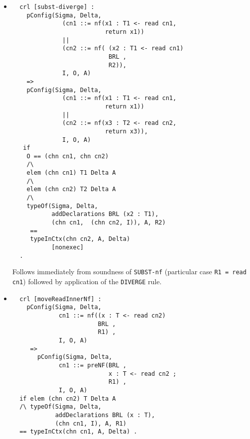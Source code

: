 \documentclass{article}
\begin{document}
\begin{itemize}
\begin{lstlisting}
  crl [SUBST-nf-read] : 
     pConfig(Sigma, Delta,
             (cn1 ::= nf((x2 : T1 <- read cn), 
                         return x2)) || 
             (cn2 ::= nf( (x1 : T1 <- read cn1) 
                          BRL , 
                          R2) ),
             I, O, A)  
     => 
     pConfig(Sigma, Delta,
             (cn1 ::= nf((x2 : T1 <- read cn), 
                         return x2)) || 
             (cn2 ::= nf((x2 : T1 <- read cn) 
                         BRL , 
                         R2 [x1 / x2])),
             I, O, A) 
     if
     isElemB(cn, I, A) /\
     O ==  (chn cn1, chn cn2) /\ 
     typeOf(Sigma, Delta, 
            addDeclarations BRL (x1 : T1), 
              (chn cn1,  (chn cn2, I)), A, R2) 
     == 
     typeInCtx(chn cn2, A, Delta)
             /\
     elem (chn cn1) T1 Delta A 
             /\
     elem (chn cn) T1 Delta A           
     .   

\end{lstlisting}  

 Follows immediately from soundness of \verb+SUBST-nf+ (particular
 case \verb+R1 = read cn+) and applying the substitution strategy.

\item[subst-diverge]
 \begin{lstlisting}     
  crl [subst-diverge] : 
    pConfig(Sigma, Delta, 
              (cn1 ::= nf(x1 : T1 <- read cn1, 
                          return x1))
              || 
              (cn2 ::= nf( (x2 : T1 <- read cn1) 
                           BRL , 
                           R2)),
              I, O, A)    
    =>
    pConfig(Sigma, Delta, 
              (cn1 ::= nf(x1 : T1 <- read cn1, 
                          return x1))
              || 
              (cn2 ::= nf(x3 : T2 <- read cn2, 
                          return x3)),
              I, O, A) 
   if        
    O == (chn cn1, chn cn2)
    /\
    elem (chn cn1) T1 Delta A
    /\
    elem (chn cn2) T2 Delta A
    /\
    typeOf(Sigma, Delta, 
           addDeclarations BRL (x2 : T1), 
           (chn cn1,  (chn cn2, I)), A, R2) 
     == 
     typeInCtx(chn cn2, A, Delta)   
           [nonexec] 
  .      
       \end{lstlisting}     
  
   Follows immediately from soundness of \verb+SUBST-nf+ (particular
 case \verb+R1 = read cn1+) followed by application of the 
 \verb+DIVERGE+ rule.

\item[moveReadInnerNf]
 \begin{lstlisting}     
  crl [moveReadInnerNf] :
    pConfig(Sigma, Delta,
             cn1 ::= nf((x : T <- read cn2) 
                        BRL , 
                        R1) ,
             I, O, A)  
     => 
       pConfig(Sigma, Delta,
             cn1 ::= preNF(BRL , 
                           x : T <- read cn2 ; 
                           R1) ,
             I, O, A)    
  if elem (chn cn2) T Delta A 
  /\ typeOf(Sigma, Delta, 
            addDeclarations BRL (x : T), 
            (chn cn1, I), A, R1)
  == typeInCtx(chn cn1, A, Delta) .  
    \end{lstlisting}
    

\end{itemize}
\end{document}
